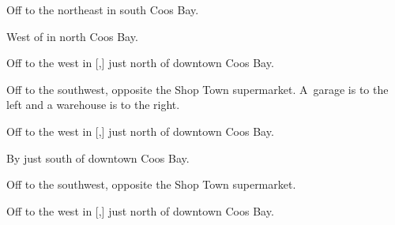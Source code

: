 

\begin{LocationList}

Off  to the northeast in south Coos Bay.

\Location{\GasStation \Gas}
West of  in north Coos Bay.

Off  to the west in [,] just north of downtown Coos Bay.

Off  to the southwest, opposite the Shop Town supermarket.
A~garage is to the left and a warehouse is to the right.

Off  to the west in [,] just north of downtown Coos Bay.

By  just south of downtown Coos Bay.

Off  to the southwest, opposite the Shop Town supermarket.

\Location{\TruckService \Rest \Service}
Off  to the west in [,] just north of downtown Coos Bay.

\end{LocationList}
